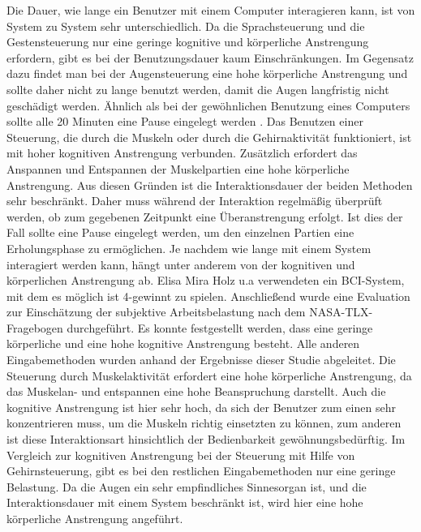 Die Dauer, wie lange ein Benutzer mit einem Computer interagieren kann, ist von System zu System sehr unterschiedlich. Da die Sprachsteuerung und die Gestensteuerung nur eine geringe kognitive und körperliche Anstrengung erfordern, gibt es bei der Benutzungsdauer kaum Einschränkungen. Im Gegensatz dazu findet man bei der Augensteuerung eine hohe körperliche Anstrengung und sollte daher nicht zu lange benutzt werden, damit die Augen langfristig nicht geschädigt werden. Ähnlich als bei der gewöhnlichen Benutzung eines Computers sollte alle 20 Minuten eine Pause eingelegt werden \cite{20Methode}. Das Benutzen einer Steuerung, die durch die Muskeln oder durch die Gehirnaktivität funktioniert, ist mit hoher kognitiven Anstrengung verbunden. Zusätzlich erfordert das Anspannen und Entspannen der Muskelpartien eine hohe körperliche Anstrengung. Aus diesen Gründen ist die Interaktionsdauer der beiden Methoden sehr beschränkt. Daher muss während der Interaktion regelmäßig überprüft werden, ob zum gegebenen Zeitpunkt eine Überanstrengung erfolgt. Ist dies der Fall sollte eine Pause eingelegt werden, um den einzelnen Partien eine Erholungsphase zu ermöglichen.
\newline \newline \newline \newline
Je nachdem wie lange mit einem System interagiert werden kann, hängt unter anderem von der kognitiven und körperlichen Anstrengung ab. Elisa Mira Holz u.a \cite{holz2013brain} verwendeten ein BCI-System, mit dem es möglich ist 4-gewinnt zu spielen. Anschließend wurde eine Evaluation zur Einschätzung der subjektive Arbeitsbelastung nach dem NASA-TLX-Fragebogen durchgeführt. Es konnte festgestellt werden, dass eine geringe körperliche und eine hohe kognitive Anstrengung besteht. Alle anderen Eingabemethoden wurden anhand der Ergebnisse dieser Studie abgeleitet. Die Steuerung durch Muskelaktivität erfordert eine hohe körperliche Anstrengung, da das Muskelan- und entspannen eine hohe Beanspruchung darstellt. Auch die kognitive Anstrengung ist hier sehr hoch, da sich der Benutzer zum einen sehr konzentrieren muss, um die Muskeln richtig einsetzten zu können, zum anderen ist diese Interaktionsart hinsichtlich der Bedienbarkeit gewöhnungsbedürftig. Im Vergleich zur kognitiven Anstrengung bei der Steuerung mit Hilfe von Gehirnsteuerung, gibt es bei den restlichen Eingabemethoden nur eine geringe Belastung. Da die Augen ein sehr empfindliches Sinnesorgan ist, und die Interaktionsdauer mit einem System beschränkt ist, wird hier eine hohe körperliche Anstrengung angeführt.
